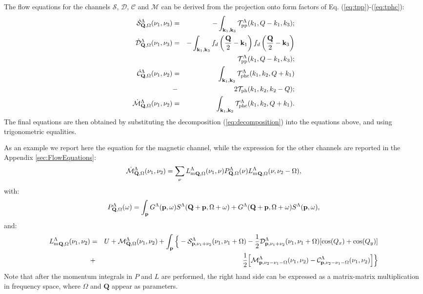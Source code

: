 The flow equations for the channels $\mathcal{S}$,  $\mathcal{D}$, $\mathcal{C}$ and $\mathcal{M}$ can be derived from the projection onto form factors of Eq. (\ref{eq:tpp})-(\ref{eq:tphc}):
\begin{eqnarray}
\dot{\mathcal{S}}_{\mathbf{Q},\Omega}^{\Lambda}(\nu_1,\nu_3)  &=& - \int _{\mathbf{k}_1, \mathbf{k}_3 } \mathcal{T}^\Lambda_{\mathrm{pp}}(k_1,Q-k_1,k_3); \\ 
\dot{\mathcal{D}}_{\mathbf{Q},\Omega}^{\Lambda}(\nu_1,\nu_3)  &=& -
\int _{\mathbf{k}_1,\mathbf{k}_3}  f_d\left( {\frac{\mathbf{Q}}{2} - \mathbf{k}_1} \right ) f_d\left ({\frac{\mathbf{Q}}{2} - \mathbf{k}_3} \right)  \nonumber \\ 
 &&\mathcal{T}^\Lambda_{\mathrm{pp}}(k_1,Q-k_1,k_3) ; 
\\
\nonumber
\dot{\mathcal{C}}_{\mathbf{Q},\Omega}^{\Lambda}(\nu_1,\nu_2) &=& 
\int _{\mathbf{k}_1,\mathbf{k}_2}   \mathcal{T}^\Lambda_{\mathrm{phc}}(k_1,k_2,Q+k_1)\\ &-&2\mathcal{T}_{\mathrm{ph}}(k_1,k_2,k_2-Q) ; 
\\ 
\dot{\mathcal{M}}_{\mathbf{Q},\Omega}^{\Lambda}(\nu_1,\nu_2) & =& 
\int _{\mathbf{k}_1,\mathbf{k}_2}  \mathcal{T}^\Lambda_{\mathrm{phc}}(k_1,k_2,Q+k_1). 
\end{eqnarray}
The final equations are then obtained by substituting the decomposition (\ref{eq:decomposition}) into the equations above, and using trigonometric equalities.
\begin{widetext}
As an example we report here the equation for the magnetic channel, while the expression for the other channels are reported in the Appendix \ref{sec:FlowEquations}: 
\begin{equation}
\dot{\mathcal{M}}^{\Lambda}_{\mathbf{Q},\Omega}(\nu_1,\nu_2) = 
\sum_\nu
{L_\mathrm{m}^\Lambda}_{\mathbf{Q},\Omega}(\nu_1,\nu) 
P_{\mathbf{Q},\Omega}^{\Lambda}(\nu) 
{L_\mathrm{m}^{\Lambda}}_{\mathbf{Q},\Omega}( \nu,\nu_2-\Omega), 
\label{eq:FlowMag}
\end{equation} 	   
with: 
\begin{equation}
P_{\mathbf{Q},\Omega}^{\Lambda}(\omega) = \int_{\mathbf{p}}  G^\Lambda(\mathbf{p},\omega)S^\Lambda(\mathbf{Q}+\mathbf{p},\Omega+\omega) +G^\Lambda(\mathbf{Q}+\mathbf{p},\Omega+\omega)
S^\Lambda(\mathbf{p},\omega),
\label{eq:Pph} 
\end{equation} 
and: 
\begin{eqnarray} 
\nonumber
{L_{\mathrm{m}}^\Lambda}_{\mathbf{Q},\Omega}(\nu_1,\nu_2)
&=&
U+\mathcal{M}^\Lambda_{\mathbf{Q},\Omega}(\nu_1,\nu_2) 
+ \int_{\mathbf{p}} \Big \{- \mathcal{S}^\Lambda_{\mathbf{p},\nu_1+\nu_2}(\nu_1,\nu_1+\Omega)  
-\frac{1}{2} 
\mathcal{D}^\Lambda_{\mathbf{p},\nu_1+\nu_2}(\nu_1,\nu_1+\Omega)
[\cos(Q_x)+\cos(Q_y)]  
\\
&+&\frac{1}{2} \Big[  \mathcal{M}^\Lambda_{\mathbf{p},\nu_2-\nu_1-\Omega}( \nu_1,\nu_2) 
- \mathcal{C}^\Lambda_{\mathbf{p},\nu_2-\nu_1-\Omega}(\nu_1,\nu_2) \Big] 
\Big \}
\label{eq:Lxph} 
\end{eqnarray}	 
Note that after the momentum integrals in $P$ and $L$ are performed, the right hand side can be expressed as a matrix-matrix multiplication in frequency space, where $\Omega$ and $\mathbf{Q}$ appear as parameters.
\end{widetext}

